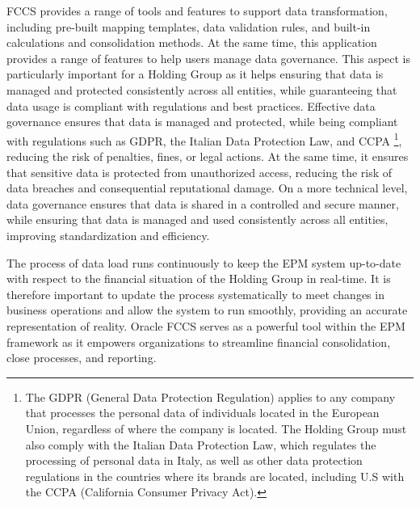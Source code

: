\documentclass[12pt,a4paper,openright,twoside]{book}
\begin{document}
FCCS provides a range of tools and features to support data transformation, including pre-built mapping templates, data validation rules, and built-in calculations and consolidation methods. 
%
At the same time, this application provides a range of features to help users manage data governance.
%
This aspect is particularly important for a Holding Group as it helps ensuring that data is managed and protected consistently across all entities, while guaranteeing that data usage is compliant with regulations and best practices.
%
Effective data governance ensures that data is managed and protected, while being compliant with regulations such as GDPR, the Italian Data Protection Law, and CCPA \footnote{The GDPR (General Data Protection Regulation) applies to any company that processes the personal data of individuals located in the European Union, regardless of where the company is located. The Holding Group must also comply with the Italian Data Protection Law, which regulates the processing of personal data in Italy, as well as other data protection regulations in the countries where its brands are located, including U.S with the CCPA (California Consumer Privacy Act).}, reducing the risk of penalties, fines, or legal actions.
%
At the same time, it ensures that sensitive data is protected from unauthorized access,  reducing the risk of data breaches and consequential reputational damage.
%
On a more technical level, data governance ensures that data is shared in a controlled and secure manner, while ensuring that data is managed and used consistently across all entities, improving standardization and efficiency.

The process of data load runs continuously to keep the EPM system up-to-date with respect to the financial situation of the Holding Group in real-time.
%
It is therefore important to update the process systematically to meet changes in business operations and allow the system to run smoothly, providing an accurate representation of reality.
%
Oracle FCCS serves as a powerful tool within the EPM framework as it empowers organizations to streamline financial consolidation, close processes, and reporting. 
\end{document}

